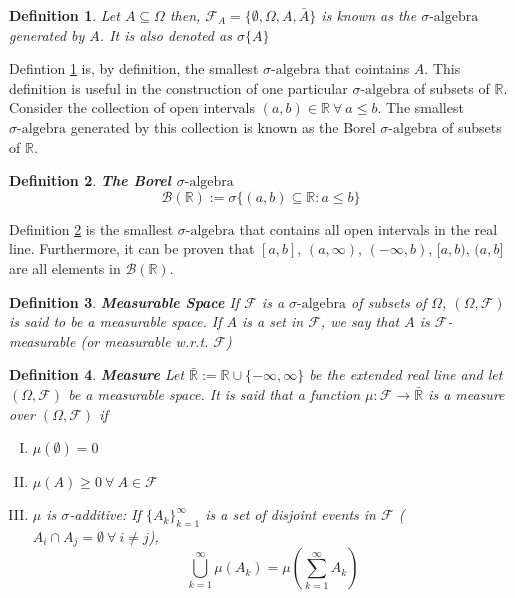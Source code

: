 \documentclass[11pt]{report}
\newtheorem{definition}{Definition}[chapter]
\newcommand{\salg}{\sigma\text{-algebra}}
\newcommand{\borelsalg}{\mathscr{B}(\mathbb{R})}
\begin{document}
\begin{definition}\label{salgebra_generated}
	Let $A \subseteq \Omega$ then, $\mathscr{F}_A = \{\emptyset, \Omega, A, \bar{A}\}$ is known as the $\salg$ generated by $A$. It is also denoted as $\sigma\{A\}$
\end{definition}

Defintion \ref{salgebra_generated} is, by definition, the smallest $\salg$ that cointains $A$. This definition is useful in the construction of one particular $\salg$ of subsets of $\mathbb{R}$.\\

Consider the collection of open intervals $(a,b) \in \mathbb{R} \ \forall \ a \leq b$. The smallest $\salg$ generated by this collection is known as the Borel $\salg$ of subsets of $\mathbb{R}$.

\begin{definition}{\textbf{The Borel $\salg$}}\label{borel_sigma_alg}
		\begin{equation}
			\borelsalg := \sigma\{(a,b) \subseteq \mathbb{R}:a\leq b\}
		\end{equation}
\end{definition}

Definition \ref{borel_sigma_alg} is the smallest $\salg$ that contains all open intervals in the real line. Furthermore, it can be proven that $[a, b]$, $(a,\infty)$, $(-\infty, b)$, $[a, b)$, $(a, b]$ are all elements in $\borelsalg$. 

\begin{definition}{\textbf{Measurable Space}}
	If $\mathscr{F}$ is a $\salg$ of subsets of $\Omega$, $(\Omega, \mathscr{F})$ is said to be a measurable space. If $A$ is a set in $\mathscr{F}$, we say that $A$ is $\mathscr{F}$-measurable (or measurable w.r.t. $\mathscr{F}$)
\end{definition}

\begin{definition}{\textbf{Measure}}
	Let $\bar{\mathbb R} := \mathbb R \cup \{-\infty, \infty\}$ be the extended real line and let $(\Omega, \mathscr{F})$ be a measurable space. It is said that a function $\mu: \mathscr{F} \rightarrow \bar{\mathbb R}$ is a measure over $(\Omega, \mathscr{F})$ if
	\begin{enumerate}[I.]
		\item $\mu(\emptyset) = 0$
		\item $\mu(A) \geq 0\ \forall \ A \in \mathscr{F} $
		\item $\mu$ is $\sigma$-additive: If $\{A_k\}_{k=1}^{\infty}$ is a set of disjoint events in $\mathscr{F}$ ($A_i \cap A_j = \emptyset \ \forall \ i \neq j$), 
		\begin{equation*}
			\bigcup_{k=1}^{\infty} \mu(A_k) = \mu(\sum_{k=1}^{\infty} A_k)
		\end{equation*}
	\end{enumerate}
\end{definition}
\end{document}
